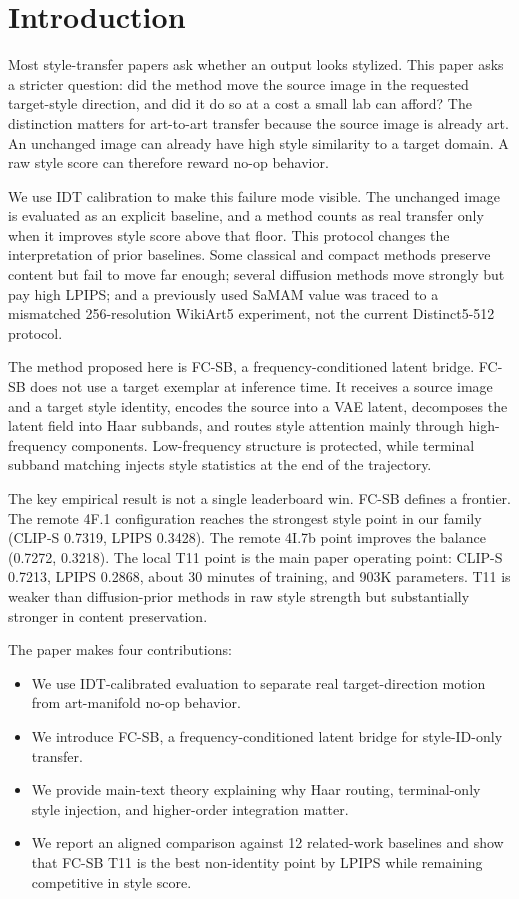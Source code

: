 \documentclass[letterpaper]{article}
\begin{document}
\section{Introduction}
Most style-transfer papers ask whether an output looks stylized. This paper asks a stricter question: did the method move the source image in the requested target-style direction, and did it do so at a cost a small lab can afford? The distinction matters for art-to-art transfer because the source image is already art. An unchanged image can already have high style similarity to a target domain. A raw style score can therefore reward no-op behavior.

We use IDT calibration to make this failure mode visible. The unchanged image is evaluated as an explicit baseline, and a method counts as real transfer only when it improves style score above that floor. This protocol changes the interpretation of prior baselines. Some classical and compact methods preserve content but fail to move far enough; several diffusion methods move strongly but pay high LPIPS; and a previously used SaMAM value was traced to a mismatched 256-resolution WikiArt5 experiment, not the current Distinct5-512 protocol.

The method proposed here is FC-SB, a frequency-conditioned latent bridge. FC-SB does not use a target exemplar at inference time. It receives a source image and a target style identity, encodes the source into a VAE latent, decomposes the latent field into Haar subbands, and routes style attention mainly through high-frequency components. Low-frequency structure is protected, while terminal subband matching injects style statistics at the end of the trajectory.

The key empirical result is not a single leaderboard win. FC-SB defines a frontier. The remote 4F.1 configuration reaches the strongest style point in our family (CLIP-S 0.7319, LPIPS 0.3428). The remote 4I.7b point improves the balance (0.7272, 0.3218). The local T11 point is the main paper operating point: CLIP-S 0.7213, LPIPS 0.2868, about 30 minutes of training, and 903K parameters. T11 is weaker than diffusion-prior methods in raw style strength but substantially stronger in content preservation.

The paper makes four contributions:
\begin{itemize}
\item We use IDT-calibrated evaluation to separate real target-direction motion from art-manifold no-op behavior.
\item We introduce FC-SB, a frequency-conditioned latent bridge for style-ID-only transfer.
\item We provide main-text theory explaining why Haar routing, terminal-only style injection, and higher-order integration matter.
\item We report an aligned comparison against 12 related-work baselines and show that FC-SB T11 is the best non-identity point by LPIPS while remaining competitive in style score.
\end{itemize}
\end{document}
